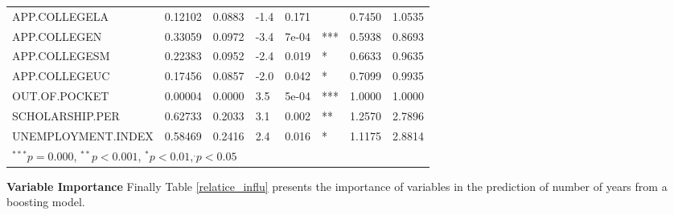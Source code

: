\documentclass[12pt,english]{report}
\begin{document}
\begin{table}[H]
\begin{adjustbox}{width=0.95\textwidth}
\begin{tabular}{|llllllll|}
APP.COLLEGELA                  &  0.12102 & 0.0883 &  -1.4  &  0.171 &    &0.7450 & 1.0535 \\
APP.COLLEGEN                   &  0.33059 & 0.0972 &  -3.4  &  7e-04 & ***&0.5938 & 0.8693 \\
APP.COLLEGESM                  &  0.22383 & 0.0952 &  -2.4  &  0.019 & *  &0.6633 & 0.9635 \\
APP.COLLEGEUC                  &  0.17456 & 0.0857 &  -2.0  &  0.042 & *  &0.7099 & 0.9935 \\
OUT.OF.POCKET                  &  0.00004 & 0.0000 &   3.5  &  5e-04 & ***&1.0000 & 1.0000 \\
SCHOLARSHIP.PER                &  0.62733 & 0.2033 &   3.1  &  0.002 & ** &1.2570 & 2.7896 \\
UNEMPLOYMENT.INDEX             &  0.58469 & 0.2416 &   2.4  &  0.016 & *  &1.1175 & 2.8814 \\
\hline \hline
\multicolumn{7}{l}{\scriptsize{$^{***} p=0.000$, $^{**} p<0.001$, $^*p<0.01$,$^{.}p<0.05$}}

\end{tabular}
\end{adjustbox}
\end{table}
 

 
 
 
 
 
 
 
 
 
 
 
 
 
 
 
 
 
 
 
 
 
 





\vspace{0.15in}
\noindent \textbf{Variable Importance} Finally Table \ref{relatice_influ} presents the importance of variables in the prediction of number of years from a boosting model. %
\end{document}
